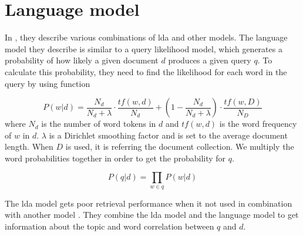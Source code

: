 \section{Language model}
In \cite{yang2009topic}, they describe various combinations of \gls{lda} and other models. 
The language model they describe is similar to a query likelihood model, which generates a probability of how likely a given document $d$ produces a given query $q$.
To calculate this probability, they need to find the likelihood for each word in the query by using function 

$$ P(w|d) = \frac{N_d}{N_d + \lambda} \cdot \frac{tf(w,d)}{N_d} + (1 - \frac{N_d}{N_d + \lambda}) \cdot \frac{tf(w,D)}{N_D} $$
where $N_d$ is the number of word tokens in $d$ and $tf(w,d)$ is the word frequency of $w$ in $d$. $\lambda$ is a Dirichlet smoothing factor and is set to the average document length.
When $D$ is used, it is referring the document collection.
We multiply the word probabilities together in order to get the probability for $q$.

$$ P(q|d) = \prod_{w \in q} P(w|d) $$
 
The \gls{lda} model gets poor retrieval performance when it not used in combination with another model \cite{yang2009topic}.
They combine the \gls{lda} model and the language model to get information about the topic and word correlation between $q$ and $d$.
